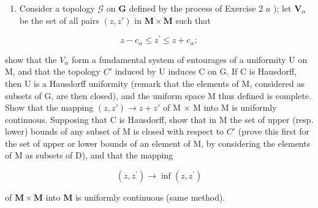 \begin{enumerate}
\def\labelenumi{\alph{enumi})}
\tightlist
\item
  Consider a topology \(\mathcal{G}\) on \(\mathbf{G}\) defined by the process of Exercise 2 \(a\) ); let \(\mathbf{V}_{\alpha}\) be the set of all pairs \((z, z')\) in \(\mathbf{M} \times \mathbf{M}\) such that
\end{enumerate}

\[
z - c _ {\alpha} \leqslant z ^ {\prime} \leqslant z + c _ {\alpha};
\]

show that the \(V_{\alpha}\) form a fundamental system of entourages of a uniformity U on M, and that the topology \(C'\) induced by U induces C on G. If C is Hausdorff, then U is a Hausdorff uniformity (remark that the elements of M, considered as subsets of G, are then closed), and the uniform space M thus defined is complete. Show that the mapping \((z, z') \to z + z'\) of M × M into M is uniformly continuous. Supposing that C is Hausdorff, show that in M the set of upper (resp. lower) bounds of any subset of M is closed with respect to \(C'\) (prove this first for the set of upper or lower bounds of an element of M, by considering the elements of M as subsets of D), and that the mapping

\[
(z, z ^ {\prime}) \rightarrow \inf (z, z ^ {\prime})
\]

of \(\mathbf{M} \times \mathbf{M}\) into \(\mathbf{M}\) is uniformly continuous (same method).

